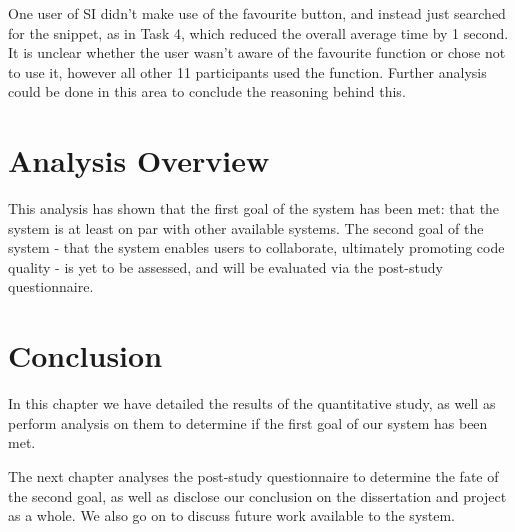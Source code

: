 One user of SI didn't make use of the favourite button, and instead just searched for the snippet, as in Task 4, which reduced the overall average time by 1 second.
It is unclear whether the user wasn't aware of the favourite function or chose not to use it, however all other 11 participants used the function. 
Further analysis could be done in this area to conclude the reasoning behind this.

\section{Analysis Overview}
This analysis has shown that the first goal of the system has been met: that the system is at least on par with other available systems.
The second goal of the system - that the system enables users to collaborate, ultimately promoting code quality - is yet to be assessed, and will be evaluated via the post-study questionnaire.

\section{Conclusion}
In this chapter we have detailed the results of the quantitative study, as well as perform analysis on them to determine if the first goal of our system has been met.

The next chapter analyses the post-study questionnaire to determine the fate of the second goal, as well as disclose our conclusion on the dissertation and project as a whole.
We also go on to discuss future work available to the system.

 


